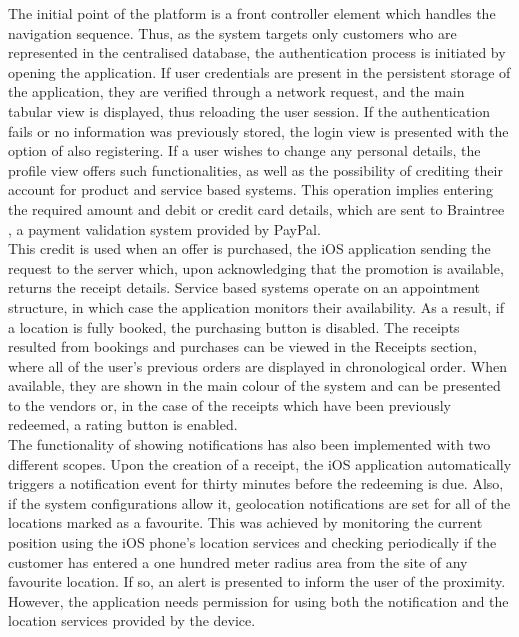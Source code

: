 The initial point of the platform is a front controller element which handles the navigation sequence. Thus, as the system targets only customers who are represented in the centralised database, the authentication process is initiated by opening the application. If user credentials are present in the persistent storage of the application, they are verified through a network request, and the main tabular view is displayed, thus reloading the user session. If the authentication fails or no information was previously stored, the login view is presented with the option of also registering. If a user wishes to change any personal details, the profile view offers such functionalities, as well as the possibility of crediting their account for product and service based systems. This operation implies entering the required amount and debit or credit card details, which are sent to Braintree \cite{braintree}, a payment validation system provided by PayPal. \\

This credit is used when an offer is purchased, the iOS application sending the request to the server which, upon acknowledging that the promotion is available, returns the receipt details. Service based systems operate on an appointment structure, in which case the application monitors their availability. As a result, if a location is fully booked, the purchasing button is disabled. The receipts resulted from bookings and purchases can be viewed in the Receipts section, where all of the user's previous orders are displayed in chronological order. When available, they are shown in the main colour of the system and can be presented to the vendors or, in the case of the receipts which have been previously redeemed, a rating button is enabled.\\

The functionality of showing notifications has also been implemented with two different scopes. Upon the creation of a receipt, the iOS application automatically triggers a notification event for thirty minutes before the redeeming is due. Also, if the system configurations allow it, geolocation notifications are set for all of the locations marked as a favourite. This was achieved by monitoring the current position using the iOS phone's location services and checking periodically if the customer has entered a one hundred meter radius area from the site of any favourite location. If so, an alert is presented to inform the user of the proximity. However, the application needs permission for using both the notification and the location services provided by the device.\\

